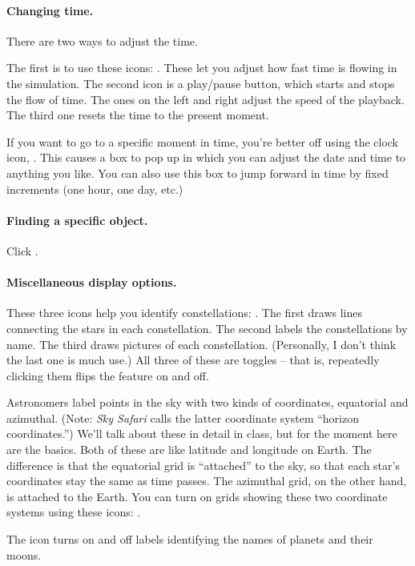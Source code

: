\paragraph{Changing time.} There are two ways to adjust the 
time.

The first is to use these icons: 
. These let you adjust
how fast time is flowing in the simulation.
The second icon is a play/pause button, which starts and stops the flow
of time. The ones on the left and right adjust the speed of the playback.
The third one resets the time to the present moment.

If you want to go to a specific moment in time, you're better off
using the clock icon, . This causes a
box to pop up in which you can adjust the date and time to anything
you like. You can also use this box to jump forward in time by fixed
increments (one hour, one day, etc.)

\paragraph{Finding a specific object.} Click .

\paragraph{Miscellaneous display options.} 

These three icons help you identify
constellations: . The first draws lines connecting
the stars in each constellation. The second labels the constellations by
name. The third draws pictures of each constellation. (Personally, I
don't think the last one is much use.) All three of these are toggles --
that is, repeatedly clicking them flips the feature on and off.

Astronomers label points in the sky with two kinds of coordinates, equatorial
and azimuthal. (Note: \textit{Sky Safari} calls the latter
coordinate system ``horizon coordinates.'') 
We'll talk about these in detail in class,
but for the moment here are the basics.
Both of these are like latitude and longitude on Earth. The
difference is that the equatorial grid is ``attached'' to the sky, so
that each star's coordinates stay the same as time passes. The azimuthal 
grid, on the other hand, 
is attached to the Earth. You can turn on grids showing these two coordinate systems
using these icons: .

The  icon turns on and off labels identifying the names of 
planets
and their moons.

